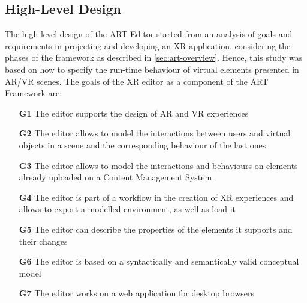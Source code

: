\clearpage
\subsection{High-Level Design}
\label{subsec:art-editor-highlevel}

The high-level design of the ART Editor started from an analysis of goals and requirements in projecting and developing an XR application, considering the phases of the framework as described in \autoref{sec:art-overview}. Hence, this study was based on how to specify the run-time behaviour of virtual elements presented in \gls{AR}/\gls{VR} scenes. The goals of the \gls{XR} editor as a component of the ART Framework are:
\begin{itemize}
    \item[\textbf{G1}] The editor supports the design of AR and VR experiences
    \item[\textbf{G2}] The editor allows to model the interactions between users and virtual objects in a scene and the corresponding behaviour of the last ones
    \item[\textbf{G3}] The editor allows to model the interactions and behaviours on elements already uploaded on a Content Management System
    \item[\textbf{G4}] The editor is part of a workflow in the creation of XR experiences and allows to export a modelled environment, as well as load it
    \item[\textbf{G5}] The editor can describe the properties of the elements it supports and their changes
    \item[\textbf{G6}] The editor is based on a syntactically and semantically valid conceptual model
    \item[\textbf{G7}] The editor works on a web application for desktop browsers
\end{itemize}

